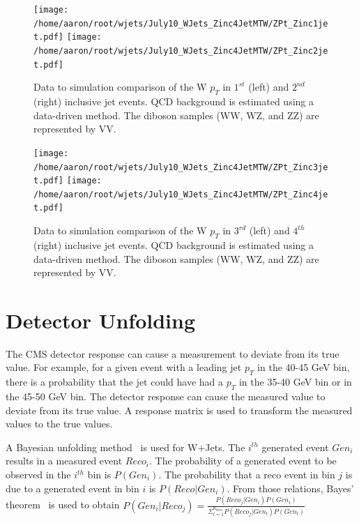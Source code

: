 \documentclass[oneside, letterpaper, oldfontcommands]{memoir}
\begin{document}
\begin{figure}[!Hhtbp]
\begin{center}
\texttt{[image: /home/aaron/root/wjets/July10\_WJets\_Zinc4JetMTW/ZPt\_Zinc1jet.pdf]}
\texttt{[image: /home/aaron/root/wjets/July10\_WJets\_Zinc4JetMTW/ZPt\_Zinc2jet.pdf]}
\end{center}
\caption{Data to simulation comparison of the W $p_{T}$ in $1^{st}$ (left) and $2^{nd}$ (right) inclusive jet events. QCD background is estimated using a data-driven method. The diboson samples (WW, WZ, and ZZ) are represented by VV.}
\label{eta12}
\end{figure}

\begin{figure}[!Hhtbp]
\begin{center}
\texttt{[image: /home/aaron/root/wjets/July10\_WJets\_Zinc4JetMTW/ZPt\_Zinc3jet.pdf]}
\texttt{[image: /home/aaron/root/wjets/July10\_WJets\_Zinc4JetMTW/ZPt\_Zinc4jet.pdf]}
\end{center}
\caption{Data to simulation comparison of the W $p_{T}$ in  $3^{rd}$ (left) and $4^{th}$ (right) inclusive jet events. QCD background is estimated using a data-driven method. The diboson samples (WW, WZ, and ZZ) are represented by VV.}
\label{eta34}
\end{figure}
\section{Detector Unfolding}
\qquad The CMS detector response can cause a measurement to deviate from its true value. For example, for a given event with a leading jet $p_{T}$ in the 40-45 GeV bin, there is a probability that the jet could have had a $p_{T}$ in the 35-40 GeV bin or in the 45-50 GeV bin. The detector response can cause the measured value to deviate from its true value. A response matrix is used to transform the measured values to the true values. 

\qquad A Bayesian unfolding method~\cite{D'Agostini:1995487} is used for W+Jets. The $i^{th}$ generated event $Gen_{i}$ results in a measured event $Reco_{i}$. The probability of a generated event to be observed in the $i^{th}$ bin is $P(Gen_{i})$. The probability that a reco event in bin $j$ is due to a generated event in bin $i$ is $P(Reco|Gen_{i})$. From those relations, Bayes' theorem~\cite{BevingtonRobinson200207} is used to obtain $P(Gen_{i}|Reco_{j}) = \frac{P(Reco_{j}|Gen_{i})P(Gen_{i})}{\Sigma_{l=1}^{n_{bins}}P(Reco_{j}|Gen_{l})P(Gen_{l})}$
\end{document}
